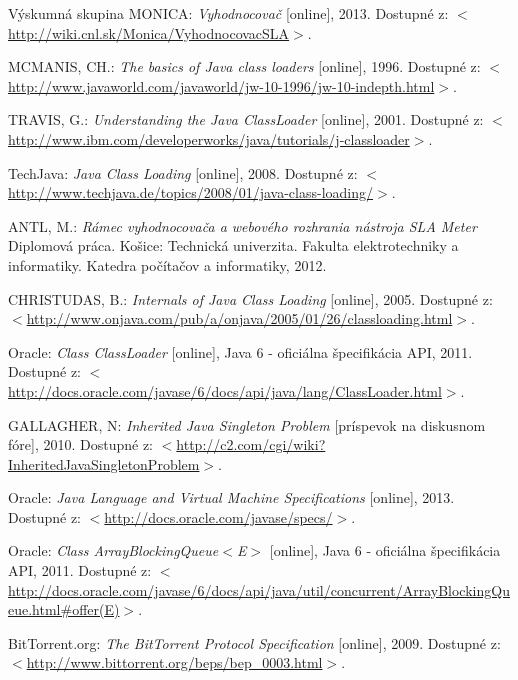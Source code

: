 \begin{thebibliography}{999}
Výskumná skupina MONICA: \emph{Vyhodnocovač} [online], 2013. 
Dostupné z: $<$\url{http://wiki.cnl.sk/Monica/VyhodnocovacSLA}$>$.

MCMANIS, CH.: \emph{The basics of Java class loaders} [online], 1996. Dostupné 
z: $<$\url{http://www.javaworld.com/javaworld/jw-10-1996/jw-10-indepth.html}$>$.

TRAVIS, G.: \emph{Understanding the Java ClassLoader} [online], 2001. Dostupné 
z: $<$\url{http://www.ibm.com/developerworks/java/tutorials/j-classloader}$>$.

TechJava: \emph{Java Class Loading} [online], 2008. Dostupné 
z: $<$\url{http://www.techjava.de/topics/2008/01/java-class-loading/}$>$.

ANTL, M.: \emph{Rámec vyhodnocovača a webového rozhrania nástroja SLA Meter} 
Diplomová práca. Košice: Technická univerzita. Fakulta elektrotechniky a informatiky. 
Katedra počítačov a informatiky, 2012.

CHRISTUDAS, B.: \emph{Internals of Java Class Loading} [online], 2005. Dostupné 
z: $<$\url{http://www.onjava.com/pub/a/onjava/2005/01/26/classloading.html}$>$.

Oracle: \emph{Class ClassLoader} [online], Java 6 - oficiálna špecifikácia API, 2011. 
Dostupné z: $<$\url{http://docs.oracle.com/javase/6/docs/api/java/lang/ClassLoader.html}$>$.

GALLAGHER, N: \emph{Inherited Java Singleton Problem} [príspevok na diskusnom fóre], 2010. 
Dostupné z: $<$\url{http://c2.com/cgi/wiki?InheritedJavaSingletonProblem}$>$.

Oracle: \emph{Java Language and Virtual Machine Specifications} [online], 2013. 
Dostupné z: $<$\url{http://docs.oracle.com/javase/specs/}$>$.

Oracle: \emph{Class ArrayBlockingQueue$<$E$>$} [online], Java 6 - oficiálna špecifikácia API, 2011. 
Dostupné z: 
$<$\url{http://docs.oracle.com/javase/6/docs/api/java/util/concurrent/ArrayBlockingQueue.html#offer(E)}$>$.

BitTorrent.org: \emph{The BitTorrent Protocol Specification} [online], 2009. 
Dostupné z: $<$\url{http://www.bittorrent.org/beps/bep_0003.html}$>$.

\end{thebibliography}